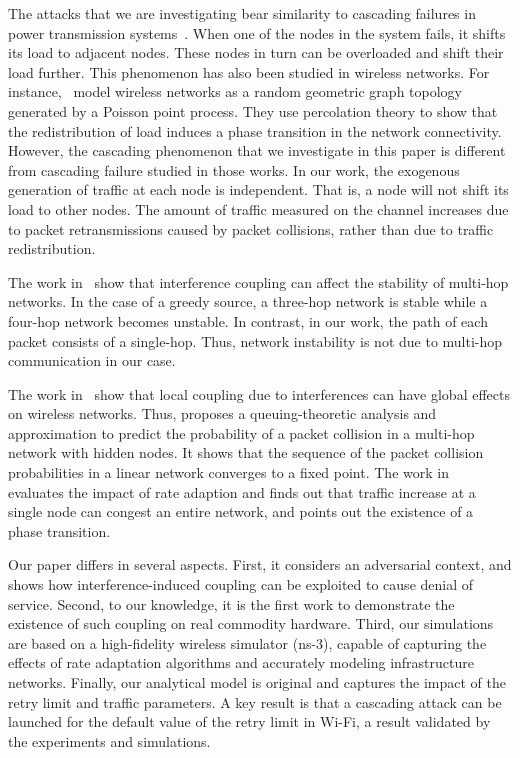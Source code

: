 \documentclass{IEEEtran}
\begin{document}
The attacks that we are investigating bear similarity to cascading
  failures in power transmission systems~\cite{kinney2005modeling, soltan2014cascading}. When one of the nodes
in the system fails, it shifts its load to adjacent nodes. These nodes in
turn can be overloaded and shift their load further. This phenomenon
has also been studied in wireless networks. For
instance,~\cite{haenggi2009stochastic, kong2009wireless} model
wireless networks as a random geometric graph topology generated by a
Poisson point process. They use percolation theory to show that the
redistribution of load induces a phase transition in the
network connectivity. However, the cascading phenomenon that we investigate
in this paper is different from cascading failure studied in those works. In our work, the exogenous generation of
traffic at each node is independent. That is, a node will
not shift its load to other nodes. The amount of traffic measured on the channel increases
due to  packet retransmissions caused by packet collisions, rather
than due to traffic redistribution.




The work in~\cite{aziz2009ez,aziz2011understanding} show that interference coupling can affect the stability of multi-hop networks. In the case of a greedy
source, a three-hop network is stable while a four-hop network becomes unstable.
In contrast, in our work, the path of each packet consists of a single-hop. Thus, network instability is not due to multi-hop communication in our case.


The work in~\cite{ray2005performance,saligrama2006macroscopic} show that local coupling due to interferences
can have global effects on wireless networks. Thus, \cite{ray2005performance} proposes
a queuing-theoretic analysis and approximation to predict the probability of a packet
collision in a multi-hop network with hidden nodes. It shows that the sequence of the
packet collision probabilities in a linear network converges to a
fixed point. The work in~\cite{saligrama2006macroscopic} evaluates the impact of rate adaption and finds out that traffic increase
at a single node can congest an entire network, and points out the existence of a phase transition.




Our paper differs in several aspects. First, it considers an adversarial context, and shows how interference-induced coupling can be exploited to
cause denial of service. Second, to our knowledge, it is the first work to demonstrate the existence of such coupling on real commodity hardware.
Third, our simulations are based on a high-fidelity wireless simulator (ns-3), capable of capturing the effects of rate adaptation algorithms and
accurately modeling  infrastructure networks. Finally, our analytical model is original and captures the impact of the retry limit and traffic
parameters. A key result is that a cascading attack can be launched for the default value of the retry limit in Wi-Fi, a result validated by the
experiments and simulations.
\end{document}
